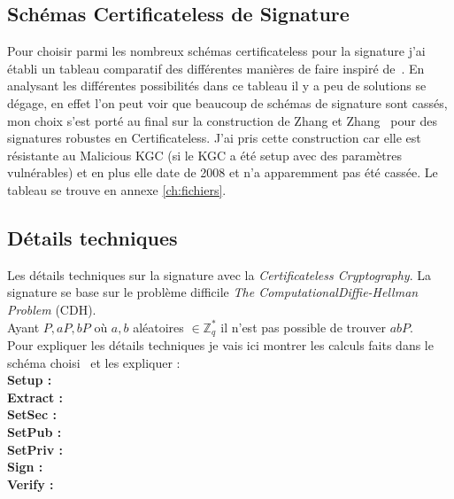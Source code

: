 \subsection{Schémas Certificateless de Signature}
Pour choisir parmi les nombreux schémas certificateless pour la signature j'ai établi un tableau comparatif des différentes manières de faire inspiré de~\cite{bookIntroCertificateless}. En analysant les différentes possibilités dans ce tableau il y a peu de solutions se dégage, en effet l'on peut voir que beaucoup de schémas de signature sont cassés, mon choix s'est porté au final sur la construction de Zhang et Zhang~\cite{DBLP:conf/icc/ZhangZ08a} pour des signatures robustes en Certificateless. J'ai pris cette construction car elle est résistante au Malicious KGC (si le KGC a été setup avec des paramètres vulnérables) et en plus elle date de 2008 et n'a apparemment pas été cassée. Le tableau se trouve en annexe \ref{ch:fichiers}.
\subsection{Détails techniques}
Les détails techniques sur la signature avec la \textit{Certificateless Cryptography}.
La signature se base sur le problème difficile \textit{The ComputationalDiffie-Hellman Problem} (CDH). \\Ayant $P, aP, bP$ où $a,b$ aléatoires $\in \mathbb{Z}_q^*$ il n'est pas possible de trouver $abP$.\\
Pour expliquer les détails techniques je vais ici montrer les calculs faits dans le schéma choisi~\cite{DBLP:conf/icc/ZhangZ08a} et les expliquer :\\
\textbf{Setup :}\\
\textbf{Extract :}\\
\textbf{SetSec :}\\
\textbf{SetPub :}\\
\textbf{SetPriv :}\\
\textbf{Sign :}\\
\textbf{Verify :}
